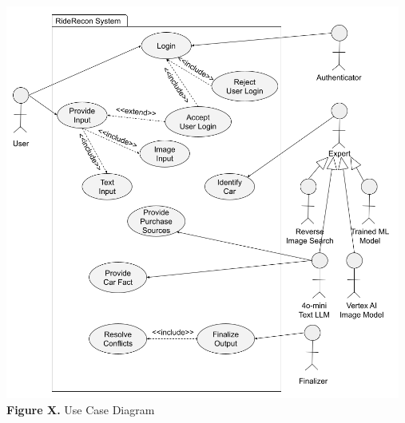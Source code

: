 \documentclass[]{article}
\begin{document}
\begin{center}
\includegraphics[height=13cm]{images/Use Case Diagram D1.png} \\
\textbf{Figure X. } Use Case Diagram
\end{center}


%
%
%
\end{document}
